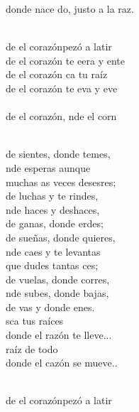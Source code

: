 \documentclass[12pt]{article}
\begin{document}
\begin{multicols*}{2}
\begin{cancion}
	donde nace do, justo a la raz.\\\jump\\
	\begin{chorus}%
	de el corazónpezó a latir  \\
	de el corazón te eera y ente  \\
	de el corazón ca tu raíz  \\
	de el corazón te eva y eve  \\
{}\vspace*{-0.4cm}\\
	de el corazón, nde el corn  \\
	\end{chorus}%
	\jump\\
	de sientes, donde temes,  \\
	nde esperas aunque \\
	muchas as veces desesres; \\
	de luchas y te rindes, \\
	nde haces y deshaces,\\
	de ganas, donde erdes;\\
	de sueñas, donde quieres, \\
	nde caes y te levantas\\
	que dudes tantas ces; \\
	de vuelas, donde corres,\\
	nde subes, donde bajas, \\
	de vas y donde enes. \\
	sca tus raíces \\
	donde el razón te lleve... \\
	 raíz de todo \\
	donde el cazón se mueve.. \\\jump\\
	\begin{chorus}%
	de el corazónpezó a latir  \\

\end{chorus}
\end{cancion}
\end{multicols*}
\end{document}
